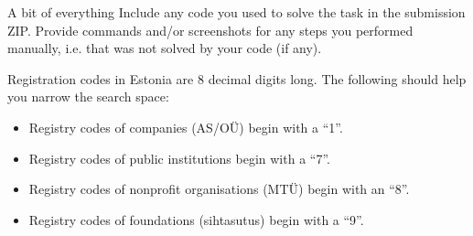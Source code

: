 \documentclass{homework}
\begin{document}
\begin{task}{A bit of everything}
  Include any code you used to solve the task in the submission ZIP.
  Provide commands and/or screenshots for any steps you performed manually, i.e. that was not solved by your code (if any).

  Registration codes in Estonia are 8 decimal digits long.
  The following should help you narrow the search space:
  \begin{itemize}
    \item Registry codes of companies (AS/OÜ) begin with a \enquote{1}.
    \item Registry codes of public institutions begin with a \enquote{7}.
    \item Registry codes of nonprofit organisations (MTÜ) begin with an \enquote{8}.
    \item Registry codes of foundations (sihtasutus) begin with a \enquote{9}.
  \end{itemize}
\end{task}
\end{document}
